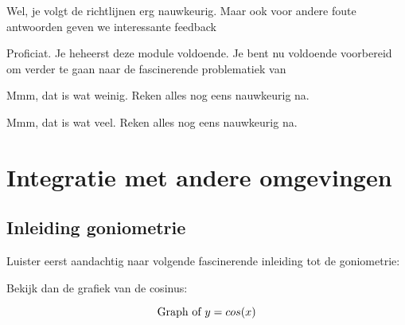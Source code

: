 \documentclass{ximera}
\begin{document}
\begin{problem}
\begin{question}
 
      
          \begin{feedback}[y==7]
            Wel, je volgt de richtlijnen erg nauwkeurig. Maar ook voor andere foute antwoorden geven we interessante feedback
          \end{feedback}
          \begin{feedback}[y==8]
          Proficiat. Je heheerst deze module voldoende. Je bent nu voldoende voorbereid om verder te gaan naar de fascinerende problematiek van 
          \end{feedback}
          \begin{feedback}[y<7]
              Mmm, dat is wat weinig. Reken alles nog eens nauwkeurig na.
            \end{feedback}
          \begin{feedback}[y>8]
               Mmm, dat is wat veel. Reken alles nog eens nauwkeurig na.
           \end{feedback}
       \end{question}
\end{problem}

\section{Integratie met andere omgevingen}

\subsection{Inleiding goniometrie}

Luister eerst aandachtig naar volgende fascinerende inleiding tot de goniometrie:
\begin{center}
\end{center}

Bekijk dan de grafiek van de cosinus:

\[  
\graph[xmin=-5,xmax=20,ymin=-1,ymax=1]{y=cos(x)}  
\] 

\end{document}
